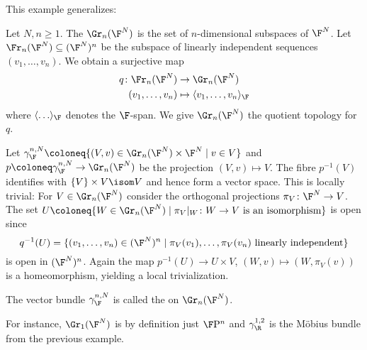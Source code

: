 This example generalizes:
\begin{example}
	Let $N, n \geq 1$.
	The  $\Gr_n(\F^N)$ is the set of $n$-dimensional subspaces of $\F^N$.
	Let $\Fr_n(\F^N) \subseteq (\F^N)^n$ be the subspace of linearly independent sequences $(v_1, \ldots, v_n)$.
	We obtain a surjective map 
	\begin{align*}
		q\colon \Fr_n(\F^N) &\to \Gr_n(\F^N) \\
		(v_1, \ldots, v_n) &\mapsto \langle v_1, \ldots, v_n\rangle_{\F}
	\end{align*}
	where $\langle \ldots\rangle_{\F}$ denotes the $\F$-span.
	We give $\Gr_n(\F^N)$ the quotient topology for $q$.

	Let $\gamma_{\F}^{n, N} \coloneq \{(V, v) \in \Gr_n(\F^N) \times \F^N \mid v \in V\}$ and $p\coloneq \gamma_{\F}^{n, N} \to \Gr_n(\F^N)$ be the projection $(V, v) \mapsto V$.
	The fibre $p^{-1}(V)$ identifies with $\{V\} \times V \isom V$ and hence form a vector space.
	This is locally trivial:
	For $V \in \Gr_n(\F^N)$ consider the orthogonal projections $\pi_V\colon \F^N \to V$.
	The set $U \coloneq \{W \in \Gr_n(\F^N) \mid \pi_V|_W\colon W \to V \text{ is an isomorphism}\}$ is open since 
	\begin{equation*}
		q^{-1}(U) = \{(v_1, \ldots, v_n) \in (\F^N)^n \mid \pi_V(v_1), \ldots, \pi_V(v_n) \text{ linearly independent}\}
	\end{equation*}
	is open in $(\F^N)^n$.
	Again the map $p^{-1}(U) \to U \times V$, $(W, v) \mapsto (W, \pi_V(v))$ is a homeomorphism, yielding a local trivialization.

	The vector bundle $\gamma_{\F}^{n, N}$ is called the  on $\Gr_n(\F^N)$.
\end{example}
For instance, $\Gr_1(\F^N)$ is by definition just $\FP^n$ and $\gamma_{\R}^{1, 2}$ is the Möbius bundle from the previous example.

